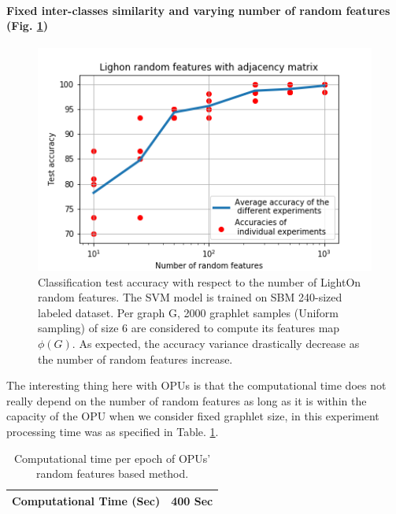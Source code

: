 \paragraph {Fixed inter-classes similarity and varying number of random features (Fig. \ref{fig:LightOn_adj_SBM_RF})}
\begin{figure}[H]
\centering
\includegraphics[scale=0.7]{LatexDiss/Dissertation/figs/LightON_adj_SBM_varying_RF.png}
\caption[Classification test accuracy as a function of the number of random features]{Classification test accuracy with respect to the number of LightOn random features. The SVM model is trained on SBM 240-sized labeled dataset. Per graph G, 2000 graphlet samples (Uniform sampling) of size 6 are considered to compute its features map $\phi(G)$. As expected, the accuracy variance drastically decrease as the number of random features increase. }
\label{fig:LightOn_adj_SBM_RF}
\end{figure}
The interesting thing here with OPUs is that the computational time does not really depend on the number of random features  as long as it is within the capacity of the OPU when we consider fixed graphlet size, in this experiment processing time was as specified in Table. \ref{table:OPU_RF_time}. 
\begin{table}[H]
\begin{center}
\begin{tabular}{|l|c|}
\hline
{\sc Computational Time (Sec)}  &  {400 Sec}\\
\hline
\end{tabular}
\end{center}
\caption{Computational time per epoch of OPUs' random features based method.}
\label{table:OPU_RF_time}
\end{table}

